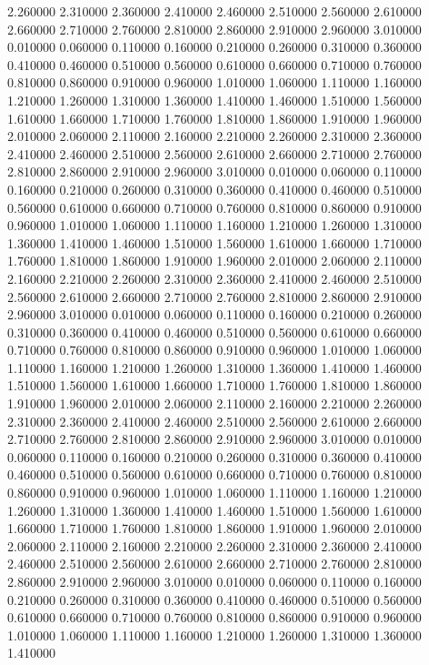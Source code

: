 2.260000
2.310000
2.360000
2.410000
2.460000
2.510000
2.560000
2.610000
2.660000
2.710000
2.760000
2.810000
2.860000
2.910000
2.960000
3.010000
0.010000
0.060000
0.110000
0.160000
0.210000
0.260000
0.310000
0.360000
0.410000
0.460000
0.510000
0.560000
0.610000
0.660000
0.710000
0.760000
0.810000
0.860000
0.910000
0.960000
1.010000
1.060000
1.110000
1.160000
1.210000
1.260000
1.310000
1.360000
1.410000
1.460000
1.510000
1.560000
1.610000
1.660000
1.710000
1.760000
1.810000
1.860000
1.910000
1.960000
2.010000
2.060000
2.110000
2.160000
2.210000
2.260000
2.310000
2.360000
2.410000
2.460000
2.510000
2.560000
2.610000
2.660000
2.710000
2.760000
2.810000
2.860000
2.910000
2.960000
3.010000
0.010000
0.060000
0.110000
0.160000
0.210000
0.260000
0.310000
0.360000
0.410000
0.460000
0.510000
0.560000
0.610000
0.660000
0.710000
0.760000
0.810000
0.860000
0.910000
0.960000
1.010000
1.060000
1.110000
1.160000
1.210000
1.260000
1.310000
1.360000
1.410000
1.460000
1.510000
1.560000
1.610000
1.660000
1.710000
1.760000
1.810000
1.860000
1.910000
1.960000
2.010000
2.060000
2.110000
2.160000
2.210000
2.260000
2.310000
2.360000
2.410000
2.460000
2.510000
2.560000
2.610000
2.660000
2.710000
2.760000
2.810000
2.860000
2.910000
2.960000
3.010000
0.010000
0.060000
0.110000
0.160000
0.210000
0.260000
0.310000
0.360000
0.410000
0.460000
0.510000
0.560000
0.610000
0.660000
0.710000
0.760000
0.810000
0.860000
0.910000
0.960000
1.010000
1.060000
1.110000
1.160000
1.210000
1.260000
1.310000
1.360000
1.410000
1.460000
1.510000
1.560000
1.610000
1.660000
1.710000
1.760000
1.810000
1.860000
1.910000
1.960000
2.010000
2.060000
2.110000
2.160000
2.210000
2.260000
2.310000
2.360000
2.410000
2.460000
2.510000
2.560000
2.610000
2.660000
2.710000
2.760000
2.810000
2.860000
2.910000
2.960000
3.010000
0.010000
0.060000
0.110000
0.160000
0.210000
0.260000
0.310000
0.360000
0.410000
0.460000
0.510000
0.560000
0.610000
0.660000
0.710000
0.760000
0.810000
0.860000
0.910000
0.960000
1.010000
1.060000
1.110000
1.160000
1.210000
1.260000
1.310000
1.360000
1.410000
1.460000
1.510000
1.560000
1.610000
1.660000
1.710000
1.760000
1.810000
1.860000
1.910000
1.960000
2.010000
2.060000
2.110000
2.160000
2.210000
2.260000
2.310000
2.360000
2.410000
2.460000
2.510000
2.560000
2.610000
2.660000
2.710000
2.760000
2.810000
2.860000
2.910000
2.960000
3.010000
0.010000
0.060000
0.110000
0.160000
0.210000
0.260000
0.310000
0.360000
0.410000
0.460000
0.510000
0.560000
0.610000
0.660000
0.710000
0.760000
0.810000
0.860000
0.910000
0.960000
1.010000
1.060000
1.110000
1.160000
1.210000
1.260000
1.310000
1.360000
1.410000
